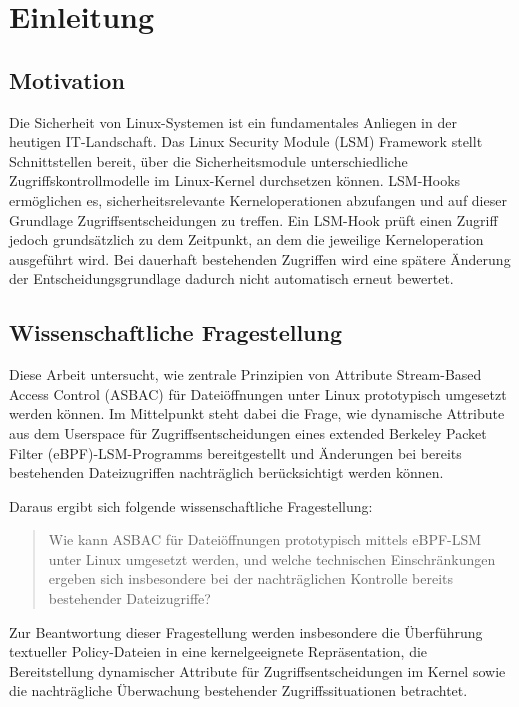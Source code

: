 \section{Einleitung}

\subsection{Motivation}
Die Sicherheit von Linux-Systemen ist ein fundamentales Anliegen in der heutigen IT-Landschaft. 
Das Linux Security Module (LSM) Framework stellt Schnittstellen bereit, über die Sicherheitsmodule unterschiedliche Zugriffskontrollmodelle im Linux-Kernel durchsetzen können\citep{kernelorgLSM}.
LSM-Hooks ermöglichen es, sicherheitsrelevante Kerneloperationen abzufangen und auf dieser Grundlage Zugriffsentscheidungen zu treffen.
Ein LSM-Hook prüft einen Zugriff jedoch grundsätzlich zu dem Zeitpunkt, an dem die jeweilige Kerneloperation ausgeführt wird.
Bei dauerhaft bestehenden Zugriffen wird eine spätere Änderung der Entscheidungsgrundlage dadurch nicht automatisch erneut bewertet.



\subsection{Wissenschaftliche Fragestellung}
Diese Arbeit untersucht, wie zentrale Prinzipien von Attribute Stream-Based Access Control (ASBAC) für Dateiöffnungen unter Linux prototypisch umgesetzt werden können.
Im Mittelpunkt steht dabei die Frage, wie dynamische Attribute aus dem Userspace für Zugriffsentscheidungen eines extended Berkeley Packet Filter (eBPF)-LSM-Programms bereitgestellt und Änderungen bei bereits bestehenden Dateizugriffen nachträglich berücksichtigt werden können.

Daraus ergibt sich folgende wissenschaftliche Fragestellung:

\begin{quote}
Wie kann ASBAC für Dateiöffnungen prototypisch mittels eBPF-LSM unter Linux umgesetzt werden, und welche technischen Einschränkungen ergeben sich insbesondere bei der nachträglichen Kontrolle bereits bestehender Dateizugriffe?
\end{quote}

Zur Beantwortung dieser Fragestellung werden insbesondere die Überführung textueller Policy-Dateien in eine kernelgeeignete Repräsentation, die Bereitstellung dynamischer Attribute für Zugriffsentscheidungen im Kernel sowie die nachträgliche Überwachung bestehender Zugriffssituationen betrachtet.

